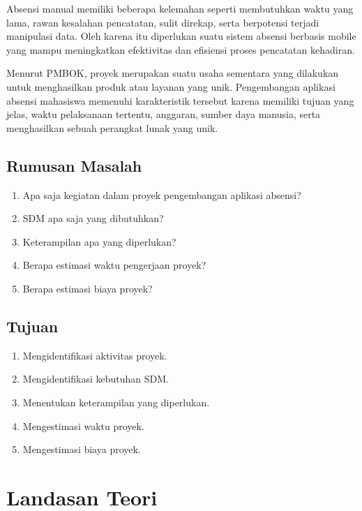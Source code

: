 \documentclass[12pt,a4paper]{article}
\begin{document}
Absensi manual memiliki beberapa kelemahan seperti membutuhkan waktu yang lama, rawan kesalahan pencatatan, sulit direkap, serta berpotensi terjadi manipulasi data. Oleh karena itu diperlukan suatu sistem absensi berbasis mobile yang mampu meningkatkan efektivitas dan efisiensi proses pencatatan kehadiran.

Menurut PMBOK, proyek merupakan suatu usaha sementara yang dilakukan untuk menghasilkan produk atau layanan yang unik. Pengembangan aplikasi absensi mahasiswa memenuhi karakteristik tersebut karena memiliki tujuan yang jelas, waktu pelaksanaan tertentu, anggaran, sumber daya manusia, serta menghasilkan sebuah perangkat lunak yang unik.


\subsection{Rumusan Masalah}

\begin{enumerate}
\item Apa saja kegiatan dalam proyek pengembangan aplikasi absensi?
\item SDM apa saja yang dibutuhkan?
\item Keterampilan apa yang diperlukan?
\item Berapa estimasi waktu pengerjaan proyek?
\item Berapa estimasi biaya proyek?
\end{enumerate}


\subsection{Tujuan}

\begin{enumerate}
\item Mengidentifikasi aktivitas proyek.
\item Mengidentifikasi kebutuhan SDM.
\item Menentukan keterampilan yang diperlukan.
\item Mengestimasi waktu proyek.
\item Mengestimasi biaya proyek.
\end{enumerate}


\section{Landasan Teori}
\end{document}
